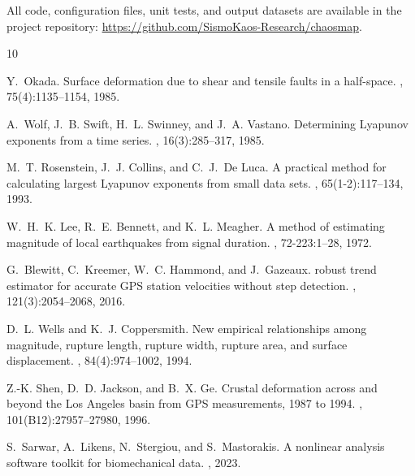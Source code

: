 \documentclass[11pt,a4paper]{article}
\begin{document}
All code, configuration files, unit tests, and output datasets are available in the project repository: \url{https://github.com/SismoKaos-Research/chaosmap}.

\begin{thebibliography}{10}

Y.~Okada.
\newblock Surface deformation due to shear and tensile faults in a half-space.
, 75(4):1135--1154, 1985.

A.~Wolf, J.~B. Swift, H.~L. Swinney, and J.~A. Vastano.
\newblock Determining {Lyapunov} exponents from a time series.
, 16(3):285--317, 1985.

M.~T. Rosenstein, J.~J. Collins, and C.~J.~De Luca.
\newblock A practical method for calculating largest {Lyapunov} exponents from small data sets.
, 65(1-2):117--134, 1993.

W.~H.~K. Lee, R.~E. Bennett, and K.~L. Meagher.
\newblock A method of estimating magnitude of local earthquakes from signal duration.
, 72-223:1--28, 1972.

G.~Blewitt, C.~Kreemer, W.~C. Hammond, and J.~Gazeaux.
 robust trend estimator for accurate {GPS} station velocities without step detection.
, 121(3):2054--2068, 2016.

D.~L. Wells and K.~J. Coppersmith.
\newblock New empirical relationships among magnitude, rupture length, rupture width, rupture area, and surface displacement.
, 84(4):974--1002, 1994.

Z.-K. Shen, D.~D. Jackson, and B.~X. Ge.
\newblock Crustal deformation across and beyond the {Los Angeles} basin from {GPS} measurements, 1987 to 1994.
, 101(B12):27957--27980, 1996.

S.~Sarwar, A.~Likens, N.~Stergiou, and S.~Mastorakis.
\newblock A nonlinear analysis software toolkit for biomechanical data.
, 2023.

\end{thebibliography}
\end{document}
